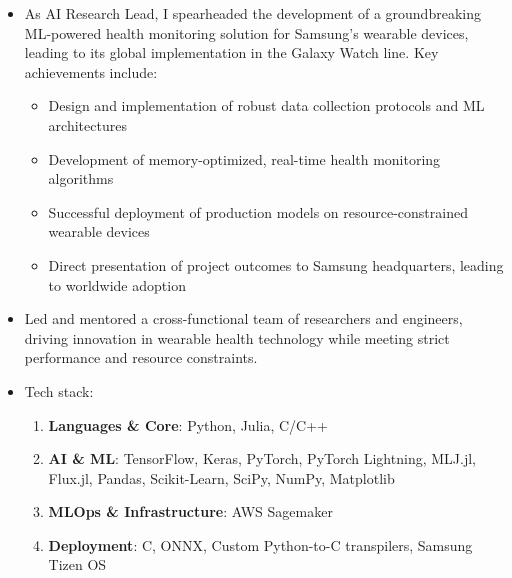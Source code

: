 {
\begin{itemize}
\item As AI Research Lead, I spearheaded the development of a groundbreaking ML-powered health monitoring solution for Samsung's wearable devices, leading to its global implementation in the Galaxy Watch line. Key achievements include:
\begin{itemize}
    \item Design and implementation of robust data collection protocols and ML architectures
    \item Development of memory-optimized, real-time health monitoring algorithms
    \item Successful deployment of production models on resource-constrained wearable devices
    \item Direct presentation of project outcomes to Samsung headquarters, leading to worldwide adoption
\end{itemize}
\item Led and mentored a cross-functional team of researchers and engineers, driving innovation in wearable health technology while meeting strict performance and resource constraints.
\item Tech stack:
\begin{enumerate}
    \item \textbf{Languages \& Core}: {\color{accent2}Python, Julia, C/C++}
    \item \textbf{AI \& ML}: {\color{accent2}TensorFlow, Keras, PyTorch, PyTorch Lightning, MLJ.jl, Flux.jl, Pandas, Scikit-Learn, SciPy, NumPy, Matplotlib}
    \item \textbf{MLOps \& Infrastructure}: {\color{accent2}AWS Sagemaker}
    \item \textbf{Deployment}: {\color{accent2}C, ONNX, Custom Python-to-C transpilers, Samsung Tizen OS}
\end{enumerate}
\end{itemize}

\divider

}
